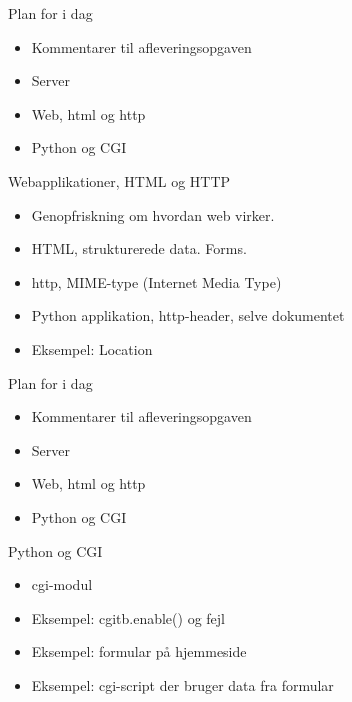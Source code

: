\documentclass[a4paper,landscape]{slides}
\begin{document}
\begin{slide}
	\begin{center} {\large 
            Plan for i dag
	} \end{center}
	\begin{itemize} \addtolength{\itemsep}{-\baselineskip}
		\item Kommentarer til afleveringsopgaven
		\item Server
		\item Web, html og http
		\item Python og CGI
	\end{itemize}
\end{slide}

\begin{slide}
	\begin{center} {\large 
            Webapplikationer, HTML og HTTP
	} \end{center}
	\begin{itemize} \addtolength{\itemsep}{-\baselineskip}
                \item Genopfriskning om hvordan web virker.
                \item HTML, strukturerede data. Forms.
                \item http, MIME-type (Internet Media Type)
                \item Python applikation, http-header, selve dokumentet
                \item Eksempel: Location
	\end{itemize}
\end{slide}

\begin{slide}
	\begin{center} {\large 
            Plan for i dag
	} \end{center}
	\begin{itemize} \addtolength{\itemsep}{-\baselineskip}
		\item Kommentarer til afleveringsopgaven
		\item Server
		\item Web, html og http
		\item Python og CGI
	\end{itemize}
\end{slide}


\begin{slide}
	\begin{center} {\large 
            Python og CGI
	} \end{center}
	\begin{itemize} \addtolength{\itemsep}{-\baselineskip}
                \item cgi-modul
                \item Eksempel: cgitb.enable() og fejl
                \item Eksempel: formular på hjemmeside
                \item Eksempel: cgi-script der bruger data fra formular
	\end{itemize}
\end{slide}
\end{document}
